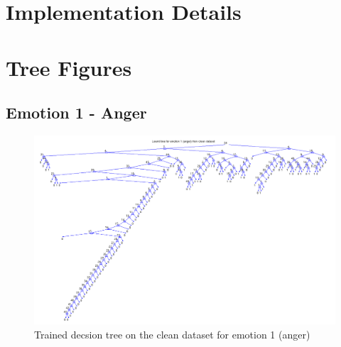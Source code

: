 \documentclass[a4paper]{article}
\begin{document}

\section{Implementation Details}

\clearpage


\section{Tree Figures}

\subsection{Emotion 1 - Anger}
\begin{figure}[H]
\center
\includegraphics[width=0.9\columnwidth]{AngerTree} %
\caption{Trained decsion tree on the clean dataset for emotion 1 (anger)}
\end{figure}

\end{document}
